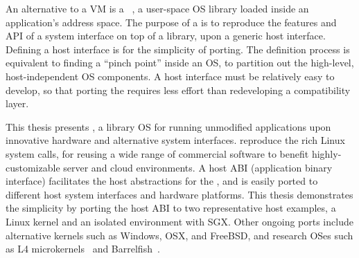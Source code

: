 An alternative to a VM is
a {\bf \libos{}}
~\cite{porter11drawbridge,engler95exokernel,libra,unikernels},
a user-space OS library loaded
inside an application's address space.
The purpose of a \libos{} is to
reproduce the features and API of a system interface on top of a library,
upon a generic host interface.
Defining a host interface is for the simplicity of porting.
The definition process
is equivalent to
finding a ``pinch point'' inside an OS,
to partition out the high-level, host-independent OS components.
A host interface must be relatively easy to develop,
so that porting the \libos{}
requires less effort than redeveloping
a compatibility layer.


This thesis presents
{\bf \graphene{}},
a library OS for running unmodified applications upon innovative hardware and alternative system interfaces.
\graphene{} reproduce the rich Linux system calls,
for reusing a wide range of commercial software
to benefit highly-customizable server and cloud environments.
A host ABI (application binary interface)
facilitates the
host abstractions for the \libos{},
and is easily ported to different host system interfaces
and hardware platforms. 
This thesis demonstrates the simplicity
by porting the host ABI
to two representative host examples, a Linux kernel and an isolated environment with SGX.
Other ongoing ports
include alternative kernels such as Windows, OSX, and FreeBSD, and research OSes such as L4 microkernels~\cite{l4family} and Barrelfish~\cite{baumann09barrelfish}.



